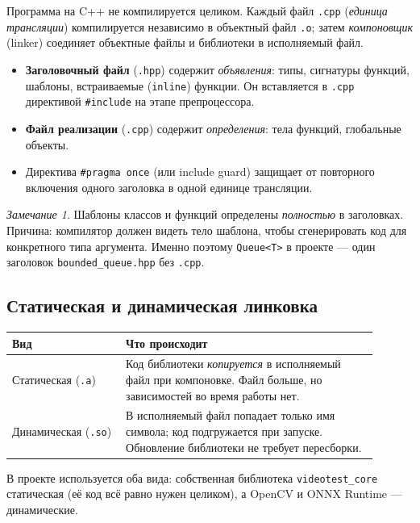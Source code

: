 \documentclass[11pt,a4paper]{article}
\theoremstyle{definition}
\theoremstyle{remark}
\newtheorem*{remark}{Замечание}
\begin{document}
Программа на C++ не компилируется целиком. Каждый файл \texttt{.cpp}
(\emph{единица трансляции}) компилируется независимо в объектный файл
\texttt{.o}; затем \emph{компоновщик} (linker) соединяет объектные файлы и
библиотеки в исполняемый файл.

\begin{itemize}
  \item \textbf{Заголовочный файл} (\texttt{.hpp}) содержит \emph{объявления}:
        типы, сигнатуры функций, шаблоны, встраиваемые (\texttt{inline})
        функции. Он вставляется в \texttt{.cpp} директивой
        \texttt{\#include} на этапе препроцессора.
  \item \textbf{Файл реализации} (\texttt{.cpp}) содержит \emph{определения}:
        тела функций, глобальные объекты.
  \item Директива \texttt{\#pragma once} (или include guard) защищает от
        повторного включения одного заголовка в одной единице трансляции.
\end{itemize}

\begin{remark}
Шаблоны классов и функций определены \emph{полностью} в заголовках. Причина:
компилятор должен видеть тело шаблона, чтобы сгенерировать код для конкретного
типа аргумента. Именно поэтому \texttt{Queue<T>} в проекте --- один заголовок
\texttt{bounded\_queue.hpp} без \texttt{.cpp}.
\end{remark}

\subsection{Статическая и динамическая линковка}

\begin{center}
\begin{tabular}{p{0.28\linewidth}p{0.62\linewidth}}
\toprule
Вид & Что происходит \\
\midrule
Статическая (\texttt{.a}) & Код библиотеки \emph{копируется} в исполняемый файл
при компоновке. Файл больше, но зависимостей во время работы нет. \\
Динамическая (\texttt{.so}) & В исполняемый файл попадает только имя символа;
код подгружается при запуске. Обновление библиотеки не требует пересборки. \\
\bottomrule
\end{tabular}
\end{center}

В проекте используется оба вида: собственная библиотека
\texttt{videotest\_core} статическая (её код всё равно нужен целиком), а
OpenCV и ONNX Runtime --- динамические.
\end{document}
